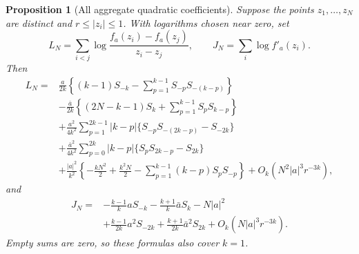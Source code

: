 \documentclass[11pt,a4paper]{article}
\numberwithin{equation}{section}
\newtheorem{proposition}[theorem]{Proposition}
\theoremstyle{definition}
\theoremstyle{remark}
\begin{document}
\begin{proposition}[All aggregate quadratic coefficients]
\label{prop:aggregate-coefficients}
Suppose the points $z_1,\ldots,z_N$ are distinct and
$r\leq|z_i|\leq1$. With logarithms chosen near zero, set
\[
 L_N=\sum_{i<j}\log\frac{f_a(z_i)-f_a(z_j)}{z_i-z_j},
 \qquad J_N=\sum_i\log f'_a(z_i).
\]
Then
\begin{align}
 L_N={}&\frac{a}{2k}
 \left\{(k-1)S_{-k}-\sum_{p=1}^{k-1}S_{-p}S_{-(k-p)}\right\}
 \nonumber\\
 &-\frac{\bar a}{2k}
 \left\{(2N-k-1)S_k+\sum_{p=1}^{k-1}S_pS_{k-p}\right\}
 \nonumber\\
 &+\frac{a^2}{4k^2}\sum_{p=1}^{2k-1}|k-p|
       \{S_{-p}S_{-(2k-p)}-S_{-2k}\}
 \nonumber\\
 &+\frac{\bar a^2}{4k^2}\sum_{p=0}^{2k}|k-p|
       \{S_pS_{2k-p}-S_{2k}\}
 \nonumber\\
 &+\frac{|a|^2}{k^2}
 \left\{-\frac{kN^2}{2}+\frac{k^2N}{2}
 -\sum_{p=1}^{k-1}(k-p)S_pS_{-p}\right\}
 +O_k(N^2|a|^3r^{-3k}),
 \label{eq:aggregate-L}
\end{align}
and
\begin{align}
 J_N={}&-\frac{k-1}{k}aS_{-k}-\frac{k+1}{k}\bar aS_k
       -N|a|^2
 \nonumber\\
 &+\frac{k-1}{2k}a^2S_{-2k}
       +\frac{k+1}{2k}\bar a^2S_{2k}
       +O_k(N|a|^3r^{-3k}).
 \label{eq:aggregate-J}
\end{align}
Empty sums are zero, so these formulas also cover $k=1$.
\end{proposition}
\end{document}
